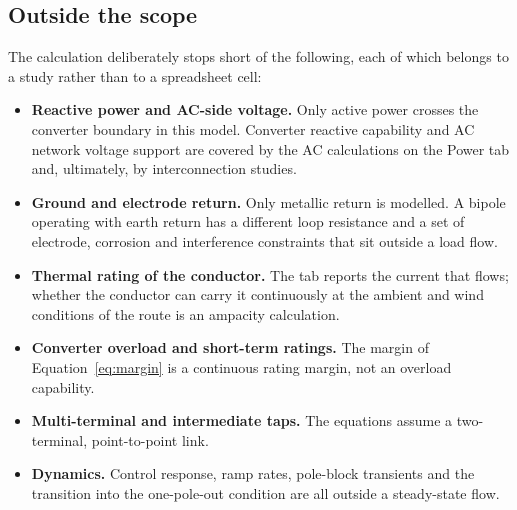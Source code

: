 \subsection{Outside the scope}
The calculation deliberately stops short of the following, each of which
belongs to a study rather than to a spreadsheet cell:

\begin{itemize}\setlength{\itemsep}{0.3em}
  \item \textbf{Reactive power and AC-side voltage.} Only active power crosses
        the converter boundary in this model. Converter reactive capability and
        AC network voltage support are covered by the AC calculations on the
        Power tab and, ultimately, by interconnection studies.
  \item \textbf{Ground and electrode return.} Only metallic return is
        modelled. A bipole operating with earth return has a different loop
        resistance and a set of electrode, corrosion and interference
        constraints that sit outside a load flow.
  \item \textbf{Thermal rating of the conductor.} The tab reports the current
        that flows; whether the conductor can carry it continuously at the
        ambient and wind conditions of the route is an ampacity calculation.
  \item \textbf{Converter overload and short-term ratings.} The margin of
        Equation~\eqref{eq:margin} is a continuous rating margin, not an
        overload capability.
  \item \textbf{Multi-terminal and intermediate taps.} The equations assume a
        two-terminal, point-to-point link.
  \item \textbf{Dynamics.} Control response, ramp rates, pole-block transients
        and the transition into the one-pole-out condition are all outside a
        steady-state flow.
\end{itemize}

